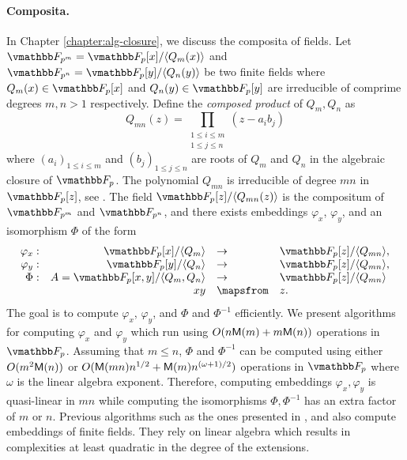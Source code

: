 \paragraph{Composita.} In Chapter \ref{chapter:alg-closure}, we discuss the composita of fields. 
Let $\F_{p^m} = \F_p[x] / \ang{Q_m(x)}$ and $\F_{p^n} = \F_p[y] / \ang{Q_n(y)}$ be two finite 
fields where $Q_m(x) \in \F_p[x]$ and $Q_n(y) \in \F_p[y]$ are irreducible of comprime degrees $m, 
n > 1$ respectively. Define the \textit{composed product} of $Q_m, Q_n$ as
\[ Q_{mn}(z) = \prod_{\substack{1 \le i \le m \\ 1 \le j \le n}} (z- a_i b_j) \]
where $(a_i)_{1 \le i \le m}$ and $(b_j)_{1 \le j \le n}$ are roots of $Q_m$ and $Q_n$ in the 
algebraic closure of $\F_p$. The polynomial $Q_{mn}$ is irreducible of degree $mn$ in $\F_p[z]$, 
see \cite{Brawley1987}. The field $\F_p[z] / \ang{Q_{mn}(z)}$ is the compositum of $\F_{p^m}$ and 
$\F_{p^n}$, and there exists embeddings $\varphi_x$, $\varphi_y$, and an isomorphism $\Phi$ of the 
form
$$
\begin{array}{rrll}
\varphi_x: & \F_p[x]/\ang{Q_m} & \to & \F_p[z]/\ang{Q_{mn}},\\
\varphi_y: & \F_p[y]/\ang{Q_n} & \to & \F_p[z]/\ang{Q_{mn}},\\
\Phi:&  A=\F_p[x,y]/\ang{Q_m,Q_n} & \to & \F_p[z]/\ang{Q_{mn}} \\
&  xy & \mapsfrom & z.
\end{array}$$
The goal is to compute $\varphi_x$, $\varphi_y$, and $\Phi$ and $\Phi^{-1}$ efficiently. We present 
algorithms for computing $\varphi_x$ and $\varphi_y$ which run using $O(n\mathsf{M}(m)+m\mathsf{M}(n))$ 
operations in $\F_p$. Assuming that $m \le n$, $\Phi$ and $\Phi^{-1}$ can be computed using either 
$O(m^2 \mathsf{M}(n))$ or $O(\mathsf{M}(mn)n^{1/2}+\mathsf{M}(m)n^{(\omega+1)/2} )$ operations in $\F_p$ where $\omega$ 
is the linear algebra exponent. Therefore, computing embeddings $\varphi_x, \varphi_y$ is 
quasi-linear in $mn$ while computing the isomorphisms $\Phi, \Phi^{-1}$ has an extra factor of $m$ 
or $n$. Previous algorithms such as the ones presented in \cite{bosma+cannon+steel97}, and 
\cite{LenstraJr91,Allombert02} also compute embeddings of finite fields. They rely on linear 
algebra which results in complexities at least quadratic in the degree of the extensions.


